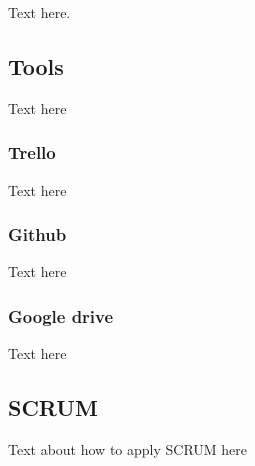 Text here.

\subsection{Tools}
Text here

\subsubsection{Trello}
Text here

\subsubsection{Github}
Text here

\subsubsection{Google drive}
Text here

\subsection{SCRUM}
Text about how to apply SCRUM here



